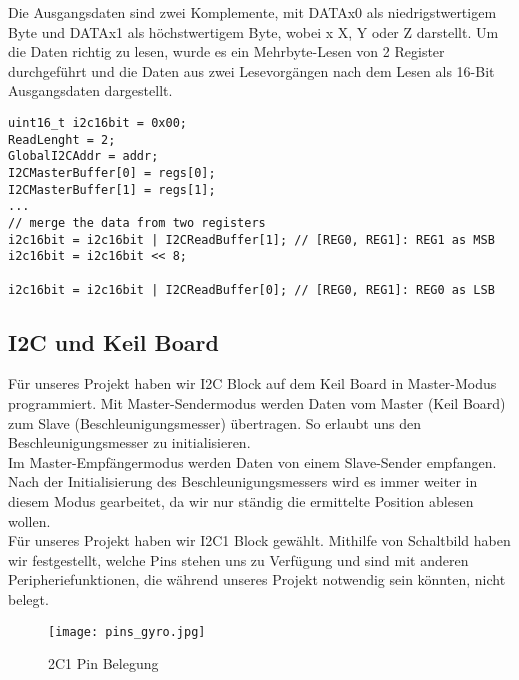 Die Ausgangsdaten sind zwei Komplemente, mit DATAx0 als niedrigstwertigem Byte und DATAx1 als höchstwertigem Byte, wobei x X, Y oder Z darstellt. Um die Daten richtig zu lesen, wurde es ein Mehrbyte-Lesen von 2 Register durchgeführt und die Daten aus zwei Lesevorgängen nach dem Lesen als 16-Bit Ausgangsdaten dargestellt. 

\begin{lstlisting}
uint16_t i2c16bit = 0x00;
ReadLenght = 2;
GlobalI2CAddr = addr;
I2CMasterBuffer[0] = regs[0];
I2CMasterBuffer[1] = regs[1];
...
// merge the data from two registers
i2c16bit = i2c16bit | I2CReadBuffer[1]; // [REG0, REG1]: REG1 as MSB
i2c16bit = i2c16bit << 8;

i2c16bit = i2c16bit | I2CReadBuffer[0]; // [REG0, REG1]: REG0 as LSB

\end{lstlisting}

\subsection{I2C und Keil Board}
Für unseres Projekt haben wir I2C Block auf dem Keil Board in Master-Modus programmiert. Mit Master-Sendermodus werden Daten vom Master (Keil Board) zum Slave (Beschleunigungsmesser) übertragen. So erlaubt uns den Beschleunigungsmesser zu initialisieren. \\

Im Master-Empfängermodus werden Daten von einem Slave-Sender empfangen. Nach der Initialisierung des Beschleunigungsmessers wird es immer weiter in diesem Modus gearbeitet, da wir nur ständig die ermittelte Position ablesen wollen. \\

Für unseres Projekt haben wir I2C1 Block gewählt. Mithilfe von Schaltbild haben wir festgestellt, welche Pins stehen uns zu Verfügung und sind mit anderen Peripheriefunktionen, die während unseres Projekt notwendig sein könnten, nicht belegt. 

\begin{figure}[!hb]
	\centering
	\texttt{[image: pins\_gyro.jpg]}
	\caption[I2C1 Pin Belegung]{2C1 Pin Belegung}
	\label{fig:i2cpins}
\end{figure}

